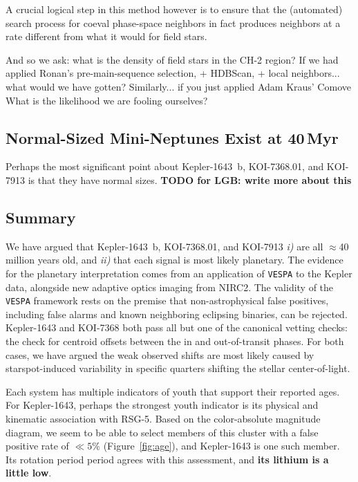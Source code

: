 \documentclass[12pt,twocolumn,linenumbers]{aastex63}
\begin{document}
A crucial logical step in this method however is to ensure that the
(automated) search process for coeval phase-space neighbors in fact
produces neighbors at a rate different from what it would for field
stars.

And so we ask: what is the density of field stars in the CH-2 region?
If we had applied Ronan's pre-main-sequence selection, + HDBScan, +
local neighbors... what would we have gotten?
Similarly... if you just applied Adam Kraus' Comove 
What is the likelihood we are fooling ourselves?


\subsection{Normal-Sized Mini-Neptunes Exist at 40$\,$Myr}


Perhaps the most significant point about
Kepler-1643~b, KOI-7368.01, and KOI-7913 is that they have normal
sizes.
{\bf TODO for LGB: write more about this}


\subsection{Summary}

We have argued that Kepler-1643~b, KOI-7368.01, and KOI-7913 {\it i)}
are all $\approx$40 million years old, and {\it ii)} that each signal
is most likely planetary.  The evidence for the planetary
interpretation comes from an application of \texttt{VESPA} to the
Kepler data, alongside new adaptive optics imaging from NIRC2.  The
validity of the \texttt{VESPA} framework rests on the premise that
non-astrophysical false positives, including false alarms and known
neighboring eclipsing binaries, can be rejected.  Kepler-1643 and
KOI-7368 both pass all but one of the canonical vetting checks: the
check for centroid offsets between the in and out-of-transit phases.
For both cases, we have argued the weak observed shifts are most
likely caused by starspot-induced variability in specific quarters
shifting the stellar center-of-light.

Each system has multiple indicators of youth that support their
reported ages.  For Kepler-1643, perhaps the strongest youth indicator
is its physical and kinematic association with RSG-5.  Based on the
color-absolute magnitude diagram, we seem to be able to select members
of this cluster with a false positive rate of $\ll 5\%$
(Figure~\ref{fig:age}), and Kepler-1643 is one such member.  Its
rotation period period agrees with this assessment, and {\bf its
lithium is a little low}.
\end{document}
